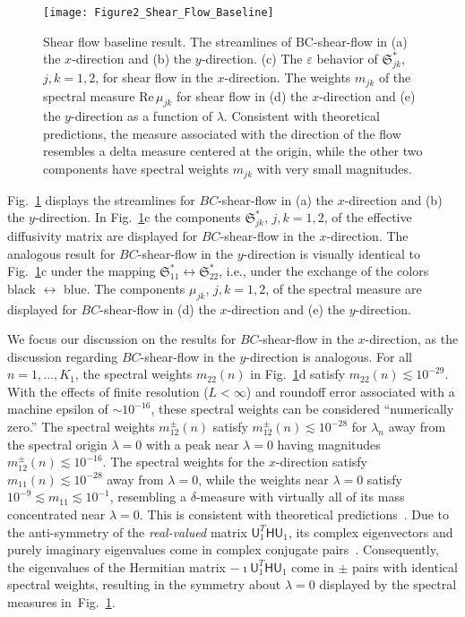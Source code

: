 \documentclass[english,12pt,jmp,graphicx]{revtex4-1}
\newcommand{\figref}[1]{Fig.~\ref{#1}}
\newcommand{\Sg}{\mathfrak{S}}
\newcommand{\Real}{\mbox{Re}\,}
\newcommand{\Hm}{\mathsf{H}}
\newcommand{\Um}{\mathsf{U}}
\begin{document}
%
\begin{figure}[t]
  \centerline{\texttt{[image: Figure2\_Shear\_Flow\_Baseline]}} 
\caption{%
  Shear flow baseline result. The streamlines of BC-shear-flow in (a) the
  $x$-direction and (b) the $y$-direction. (c) The $\varepsilon$
  behavior of  $\Sg^*_{jk}$, $j,k=1,2$, for shear flow in the
  $x$-direction. The weights $m_{jk}$ of the spectral measure
  $\Real\mu_{jk}$ for shear flow in (d) the $x$-direction and (e) the
  $y$-direction as a function of $\lambda$. Consistent with theoretical 
  predictions, the measure associated with the direction of the flow
  resembles a delta measure centered at the origin, while the other
  two components have spectral weights $m_{jk}$ with very small
  magnitudes.    
        }
\label{fig:Figure2_Shear_Flow_Baseline}
\end{figure}
%


\figref{fig:Figure2_Shear_Flow_Baseline} displays the streamlines for
$BC$-shear-flow in (a) the $x$-direction and (b) the 
$y$-direction. In  \figref{fig:Figure2_Shear_Flow_Baseline}c the components
$\Sg_{jk}^*$, $j,k=1,2$, of the effective diffusivity matrix are
displayed for $BC$-shear-flow in the $x$-direction. The analogous
result for $BC$-shear-flow in the $y$-direction is visually identical
to \figref{fig:Figure2_Shear_Flow_Baseline}c under the mapping
$\Sg_{11}^*\leftrightarrow\Sg_{22}^*$, i.e., under the exchange of the colors
black $\leftrightarrow$ blue. The components $\mu_{jk}$, $j,k=1,2$, of the 
spectral measure are displayed for $BC$-shear-flow in (d) the
$x$-direction and (e) the $y$-direction. 




We focus our discussion on the results for $BC$-shear-flow in the
$x$-direction, as the discussion regarding $BC$-shear-flow in the
$y$-direction is analogous. 
For all $n=1,\ldots,K_1$, the spectral weights $m_{22}(n)$ in
\figref{fig:Figure2_Shear_Flow_Baseline}d
satisfy $m_{22}(n)\lesssim10^{-29}$. With the effects of finite
resolution ($L<\infty$) and roundoff error associated with a machine
epsilon of $\sim10^{-16}$, these spectral weights can be considered
``numerically zero.'' The spectral weights $m^\pm_{12}(n)$ satisfy
$m^\pm_{12}(n)\lesssim10^{-28}$ for $\lambda_n$ away from the spectral
origin $\lambda=0$ with a peak near $\lambda=0$ having magnitudes
$m^\pm_{12}(n)\lesssim10^{-16}$. The spectral weights for 
the $x$-direction satisfy 
$m_{11}(n)\lesssim10^{-28}$ away from $\lambda=0$, while the weights
near $\lambda=0$ satisfy $10^{-9}\lesssim m_{11}\lesssim10^{-1}$, resembling
a $\delta$-measure with virtually all of its mass concentrated near
$\lambda=0$. This is consistent with theoretical
predictions~\cite{Avellaneda:CMP-339}. Due to the anti-symmetry of the 
\emph{real-valued} matrix 
$\Um_1^T\Hm\Um_1$, its complex eigenvectors and purely imaginary eigenvalues
come in complex conjugate
pairs~\cite{Horn_Johnson-1990}. Consequently, the eigenvalues of the 
Hermitian matrix $-\imath\Um_1^T\Hm\Um_1$ come in
$\pm$
pairs
with identical spectral weights, resulting in the symmetry about 
$\lambda=0$ displayed by the spectral measures
in~\figref{fig:Figure2_Shear_Flow_Baseline}.   
\end{document}

